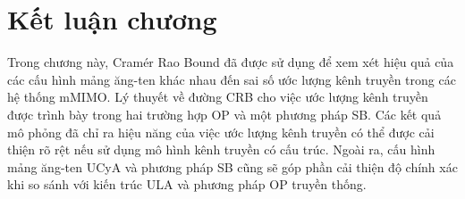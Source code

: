 \section{Kết luận chương}
Trong chương này, Cramér Rao Bound đã được sử dụng để xem xét hiệu quả của các cấu hình mảng ăng-ten khác nhau đến sai số ước lượng kênh truyền trong các hệ thống mMIMO. Lý thuyết về đường CRB cho việc ước lượng kênh truyền được trình bày trong hai trường hợp OP và một phương pháp SB. Các kết quả mô phỏng đã chỉ ra hiệu năng của việc ước lượng kênh truyền có thể được cải thiện rõ rệt nếu sử dụng mô hình kênh truyền có cấu trúc. Ngoài ra, cấu hình mảng ăng-ten UCyA và phương pháp SB cũng sẽ góp phần cải thiện độ chính xác khi so sánh với kiến trúc ULA và phương pháp OP truyền thống.